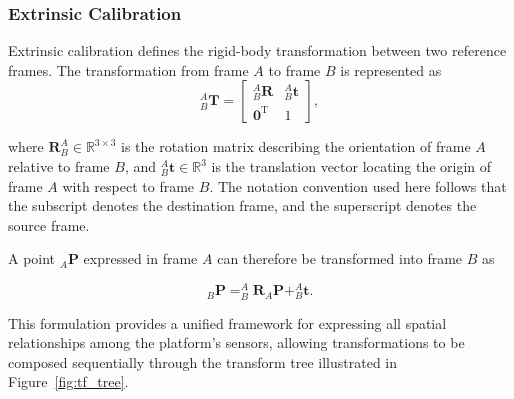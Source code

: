 \documentclass{erauthesis}
\begin{document}
\subsubsection{Extrinsic Calibration} \label{extrinsic_tform}


Extrinsic calibration defines the rigid-body transformation between two reference frames.
The transformation from frame $A$ to frame $B$ is represented as
\begin{equation}
    _{B}^{A}\mathbf{T} =
    \begin{bmatrix}
        _{B}^{A}\mathbf{R} & _{B}^{A}\mathbf{t} \\
        \mathbf{0}^\mathrm{T} & 1
    \end{bmatrix},
\end{equation}

where $\mathbf{R}_{B}^{A} \in \mathbb{R}^{3\times3}$ is the rotation matrix describing the orientation of frame $A$ relative to frame $B$, and $_{B}^{A}\mathbf{t} \in \mathbb{R}^{3}$ is the translation vector locating the origin of frame $A$ with respect to frame $B$.  
The notation convention used here follows that the subscript denotes the destination frame, and the superscript denotes the source frame.

A point $_{A}\mathbf{P}$ expressed in frame $A$ can therefore be transformed into frame $B$ as

\begin{equation}
    _{B}\mathbf{P} =
    _{B}^{A}\mathbf{R} _{A}\mathbf{P} + _{B}^{A}\mathbf{t}.
\end{equation}

This formulation provides a unified framework for expressing all spatial relationships among the platform’s sensors, allowing transformations to be composed sequentially through the transform tree illustrated in Figure~\ref{fig:tf_tree}.

\end{document}
